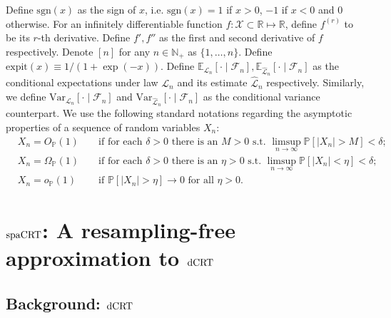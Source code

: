 \documentclass[12pt]{article}
\theoremstyle{definition}
\def\P{\mathbb{P}}
\def\sgn{\mathrm{sgn}}
\def\P{\mathbb{P}}
\newcommand{\E}{\mathbb E}								%
\newcommand{\V}{\mathrm{Var}}							%
\renewcommand{\P}{\mathbb{P}}							%
\newcommand{\expit}{\mathrm{expit}}                 	%
\newcommand{\law}{\mathcal L}							%
\newcommand{\lawhat}{\widehat{\mathcal L}}				%
\newcommand{\dCRT}{\textnormal{dCRT}} 					%
\newcommand{\spacrt}{\textnormal{spaCRT}}               %
\begin{document}
Define $\sgn(x)$ as the sign of $x$, i.e. $\sgn(x)=1$ if $x>0$, $-1$ if $x<0$ and $0$ otherwise. For an infinitely differentiable function $f:\mathcal{X}\subset\mathbb{R}\mapsto\mathbb{R}$, define $f^{(r)}$ to be its $r$-th derivative. Define $f',f''$ as the first and second derivative of $f$ respectively. Denote $[n]$ for any $n\in\mathbb{N}_+$ as $\{1,\ldots,n\}$. Define $\expit(x)\equiv 1/ (1+\exp(-x))$. Define $\E_{\law_n}[\cdot\mid\mathcal{F}_n],\E_{\lawhat_n}[\cdot\mid\mathcal{F}_n]$ as the conditional expectations under law $\law_n$ and its estimate $\lawhat_n$ respectively. Similarly, we define $\V_{\law_n}[\cdot\mid\mathcal{F}_n]$ and $\V_{\lawhat_n}[\cdot\mid\mathcal{F}_n]$ as the conditional variance counterpart. We use the following standard notations regarding the asymptotic properties of a sequence of random variables $X_n$:
\begin{align*}
  &X_n = O_{\P}(1) &&\text{ if for each } \delta > 0 \text{ there is an } M > 0 \text{ s.t. } \limsup_{n \rightarrow \infty}\P[|X_n| > M] < \delta; \\
  &X_n = \Omega_{\P}(1) &&\text{ if for each } \delta > 0 \text{ there is an } \eta > 0 \text{ s.t. } \limsup_{n \rightarrow \infty}\P[|X_n| < \eta] < \delta;\\
  &X_n = o_{\P}(1) &&\text{ if } \P[|X_n| > \eta] \rightarrow 0 \text{ for all } \eta > 0.
\end{align*}

\section{$\spacrt$: A resampling-free approximation to $\dCRT$} \label{sec:spacrt}

\subsection{Background: $\dCRT$}
\end{document}
